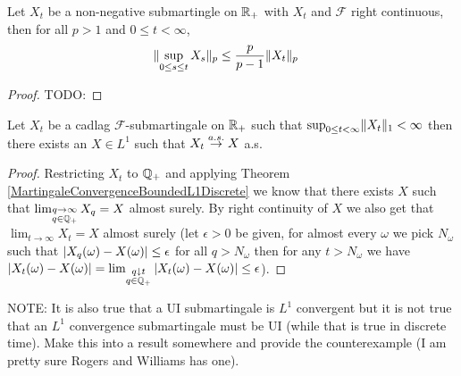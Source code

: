 \begin{lem}\label{DoobLpInequalityContinuous}Let $X_t$ be a
  non-negative submartingle on $\mathbb{R}_+$ with $X_t$ and $\mathcal{F}$ right continuous, then for all
  $p > 1$ and $0 \leq t < \infty$,
\begin{align*}
\lVert \sup_{0 \leq s \leq t} X_s \rVert_p &\leq \frac{p}{p-1}\lVert X_t \rVert_p
\end{align*}
\end{lem}
\begin{proof}
TODO:
\end{proof}

\begin{thm}\label{MartingaleConvergenceBoundedL1Continuous}Let $X_t$ be a cadlag
  $\mathcal{F}$-submartingale on $\mathbb{R}_+$ such that $\sup_{0 \leq t
    < \infty} \lVert X_t \rVert_1 <
  \infty$ then there exists an $X \in L^1$ such that $X_t \overset{a.s.}\to X$ a.s.
\end{thm}
\begin{proof}
Restricting $X_t$ to $\mathbb{Q}_+$ and applying Theorem
\ref{MartingaleConvergenceBoundedL1Discrete} we know that there
exists $X$ such that $\lim_{\substack{q \to \infty \\ q \in
    \mathbb{Q}_+}} X_q = X$ almost surely.  By right continuity of $X$
we also get that $\lim_{t \to \infty} X_t = X$ almost surely (let
$\epsilon > 0$ be given, for
almost every $\omega$ we pick $N_\omega$ such that $\left \vert X_q(\omega) -
  X(\omega) \right \vert \leq \epsilon$ for all $q > N_\omega$ then for any $t >
N_\omega$ we have $\left \vert X_t(\omega) -
  X(\omega) \right \vert = \lim_{\substack{q \downarrow t \\ q \in \mathbb{Q}_+}} \left \vert X_t(\omega) -
  X(\omega) \right \vert \leq \epsilon$).
\end{proof}


NOTE: It is also true that a UI submartingale is $L^1$ convergent
but it is not true that an $L^1$ convergence submartingale must be
UI (while that is true in discrete time).  Make this into a result
somewhere and provide the counterexample (I am pretty sure Rogers and
Williams has one).

